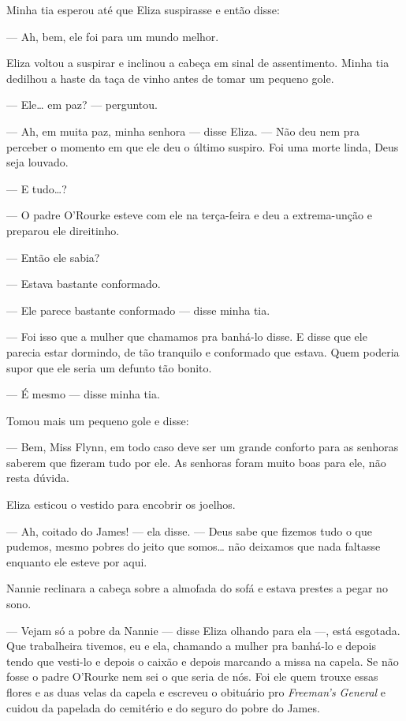 Minha tia esperou até que Eliza suspirasse e então disse:

--- Ah, bem, ele foi para um mundo melhor.

Eliza voltou a suspirar e inclinou a cabeça em sinal de assentimento.
Minha tia dedilhou a haste da taça de vinho antes de tomar um pequeno gole.

--- Ele\ldots{} em paz? --- perguntou.

--- Ah, em muita paz, minha senhora --- disse Eliza.  --- Não deu nem pra
perceber o momento em que ele deu o último suspiro.  Foi uma morte linda, Deus
seja louvado.

--- E tudo\ldots{}?

--- O padre O’Rourke esteve com ele na terça-feira e deu a extrema-unção e
preparou ele direitinho.

--- Então ele sabia?

--- Estava bastante conformado.

--- Ele parece bastante conformado --- disse minha tia.

--- Foi isso que a mulher que chamamos pra banhá-lo disse.  E disse que ele
parecia estar dormindo, de tão tranquilo e conformado que estava.  Quem poderia
supor que ele seria um defunto tão bonito.

--- É mesmo --- disse minha tia.

Tomou mais um pequeno gole e disse:

--- Bem, Miss Flynn, em todo caso deve ser um grande conforto para as
senhoras saberem que fizeram tudo por ele.  As senhoras foram muito boas para
ele, não resta dúvida.

Eliza esticou o vestido para encobrir os joelhos.

--- Ah, coitado do James! --- ela disse.  --- Deus sabe que fizemos tudo o que
pudemos, mesmo pobres do jeito que somos\ldots{} não deixamos que nada faltasse
enquanto ele esteve por aqui.

Nannie reclinara a cabeça sobre a almofada do sofá e estava prestes a pegar no
sono.

--- Vejam só a pobre da Nannie --- disse Eliza olhando para ela ---, está
esgotada.  Que trabalheira tivemos, eu e ela, chamando a mulher pra banhá-lo e
depois tendo que vesti-lo e depois o caixão e depois marcando a missa na
capela.  Se não fosse o padre O’Rourke nem sei o que seria de nós.  Foi ele
quem trouxe essas flores e as duas velas da capela e escreveu o obituário pro
\textit{Freeman’s General} e cuidou da papelada do cemitério e do seguro do
pobre do James.

